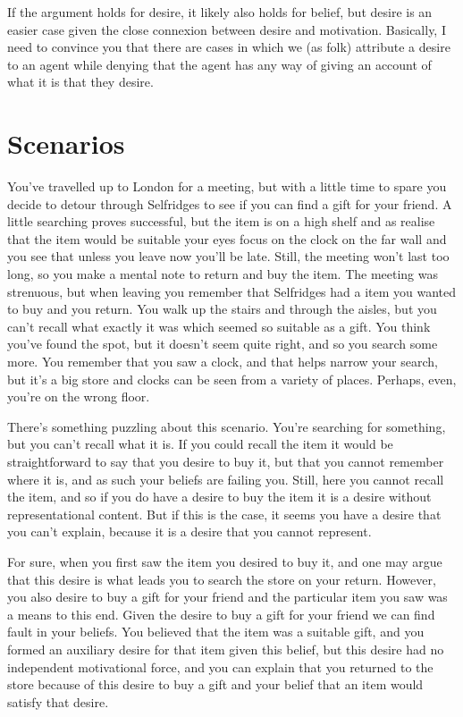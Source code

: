 \documentclass[10pt]{article}
\begin{document}
If the argument holds for desire, it likely also holds for belief, but desire is an easier case given the close connexion between desire and motivation.
Basically, I need to convince you that there are cases in which we (as folk) attribute a desire to an agent while denying that the agent has any way of giving an account of what it is that they desire.

\section{Scenarios}
\label{sec:scenarios}

\begin{scenario}\label{scn:gift}
  You've travelled up to London for a meeting, but with a little time to spare you decide to detour through Selfridges to see if you can find a gift for your friend.
  A little searching proves successful, but the item is on a high shelf and as realise that the item would be suitable your eyes focus on the clock on the far wall and you see that unless you leave now you'll be late.
  Still, the meeting won't last too long, so you make a mental note to return and buy the item.
  The meeting was strenuous, but when leaving you remember that Selfridges had a item you wanted to buy and you return.
  You walk up the stairs and through the aisles, but you can't recall what exactly it was which seemed so suitable as a gift.
  You think you've found the spot, but it doesn't seem quite right, and so you search some more.
  You remember that you saw a clock, and that helps narrow your search, but it's a big store and clocks can be seen from a variety of places.
  Perhaps, even, you're on the wrong floor.
\end{scenario}

There's something puzzling about this scenario.
You're searching for something, but you can't recall what it is.
If you could recall the item it would be straightforward to say that you desire to buy it, but that you cannot remember where it is, and as such your beliefs are failing you.
Still, here you cannot recall the item, and so if you do have a desire to buy the item it is a desire without representational content.
But if this is the case, it seems you have a desire that you can't explain, because it is a desire that you cannot represent.

For sure, when you first saw the item you desired to buy it, and one may argue that this desire is what leads you to search the store on your return.
However, you also desire to buy a gift for your friend and the particular item you saw was a means to this end.
Given the desire to buy a gift for your friend we can find fault in your beliefs.
You believed that the item was a suitable gift, and you formed an auxiliary desire for that item given this belief, but this desire had no independent motivational force, and you can explain that you returned to the store because of this desire to buy a gift and your belief that an item would satisfy that desire.
\end{document}
